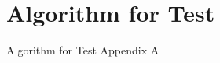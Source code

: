 \chapter[Appendix A]{Algorithm for Test}{Algorithm for Test}\label{appen1}
\vskip 10pt
\noindent
Appendix A





